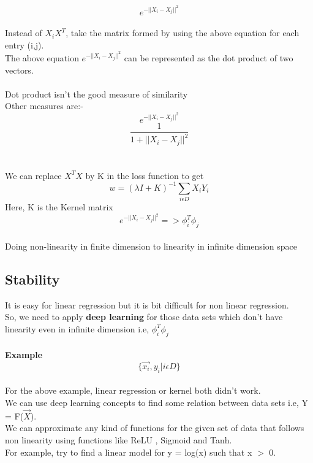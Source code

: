 \documentclass[12pt]{article}
\begin{document}
\[
     e^{-||X_i - X_j||^2}
\]
\\Instead of $X_i X^T$, take the matrix formed by using the above equation for each entry (i,j).
\\The above equation $e^{-||X_i - X_j||^2}$ can be represented as the dot product of two vectors.
\\
\\Dot product isn't the good measure of similarity
\\Other measures are:-
\\
\[
     e^{-||X_i - X_j||^2}
\]\[
     \frac{1}{1 + ||X_i - X_j||^2}
\]
\\
\\We can replace $X^TX$ by K in the loss function to get
\\
\begin{equation}
    w = (\lambda I + K)^{-1} \sum\limits_{i\epsilon D} X_i Y_i
\end{equation}
Here, K is the Kernel matrix
\\\[
    e^{-||X_i - X_j||^2} => \phi_i^T \phi_j
\]
\\Doing non-linearity in finite dimension to linearity in infinite dimension space 
\subsection{Stability}
It is easy for linear regression but it is bit difficult for non linear regression.
\\So, we need to apply \textbf{deep learning} for those data 
 sets which don't have linearity even in infinite dimension i.e, $\phi_i^T \phi_j$
 \\
 \\\textbf{Example}
 \[
    \{ \vec{x_i}, y_i | i \epsilon D \}
\]
\\For the above example, linear regression or kernel both didn't work.
\\We can use deep learning concepts to find some relation between data sets i.e, Y = F($\vec{X}$).
\\We can approximate any kind of functions for the given set of data that follows non linearity using functions like ReLU , Sigmoid and Tanh.
\\For example, try to find a linear model for y = log(x) such that x $>$ 0.
\\
\\


%


\end{document}
